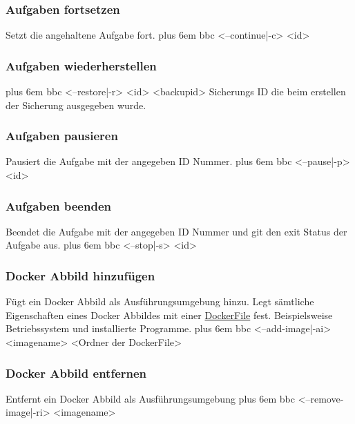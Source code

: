 \documentclass[a4paper,12pt]{article}
\makeatletter
\newenvironment{mycode}
 {\def\@xobeysp{\ }\verbatim\rightskip=0pt plus 6em\relax}
 {\endverbatim}
\makeatother
\begin{document}
\subsubsection{Aufgaben fortsetzen}
Setzt die angehaltene \gls{Aufgabe} fort.
\begin{mycode}
bbc <--continue|-c> <id>
\end{mycode}

\subsubsection{Aufgaben wiederherstellen}
\begin{mycode}
bbc <--restore|-r> <id> <backupid>
\end{mycode}
Sicherungs ID die beim erstellen der Sicherung ausgegeben wurde.

\subsubsection{Aufgaben pausieren}
Pausiert die \gls{Aufgabe} mit der angegeben ID Nummer.
\begin{mycode}
bbc <--pause|-p> <id>
\end{mycode}

\subsubsection{Aufgaben beenden}
Beendet die \gls{Aufgabe} mit der angegeben ID Nummer und git den exit Status der \gls{Aufgabe} aus.
\begin{mycode}
bbc <--stop|-s> <id>
\end{mycode}

\subsubsection{Docker Abbild hinzufügen}
Fügt ein \gls{Docker} Abbild als Ausführungsumgebung hinzu.
Legt sämtliche Eigenschaften eines \gls{Docker} Abbildes mit einer \href{https://docs.\gls{Docker}.com/engine/reference/builder/}{DockerFile} fest.
Beispielsweise Betriebssystem und installierte Programme. 
\begin{mycode}
bbc <--add-image|-ai> <imagename> <Ordner der DockerFile>
\end{mycode}

\subsubsection{Docker Abbild entfernen}
Entfernt ein \gls{Docker} Abbild als Ausführungsumgebung
\begin{mycode}
bbc <--remove-image|-ri> <imagename>
\end{mycode}
\end{document}
